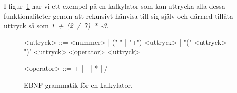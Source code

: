 I figur~\ref{fig:cfg} har vi ett exempel på en kalkylator som kan uttrycka
alla dessa funktionaliteter genom att rekursivt hänvisa till sig själv och
därmed tillåta uttryck så som \mbox{\textit{1 + (2 / 7) * -3}}.

\begin{figure}[ht]
  \begin{grammar}
    \singlespace\small%
    \selectfont

    <uttryck> ::= <nummer> | ("-" | "+") <uttryck> | "(" <uttryck> ")"
      \alt <uttryck> <operator> <uttryck>

    <operator> ::= + | - | * | /

  \end{grammar}
  \caption{EBNF grammatik för en kalkylator.}
  \label{fig:cfg}
\end{figure}

